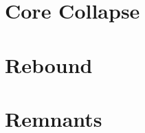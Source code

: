 	\section{Core Collapse}
		\filler
	\section{Rebound}
		\filler
	\section{Remnants}
		\filler






























